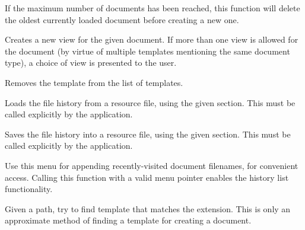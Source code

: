 If the maximum number of documents has been reached, this function
will delete the oldest currently loaded document before creating a new one.



Creates a new view for the given document. If more than one view is allowed for the
document (by virtue of multiple templates mentioning the same document type), a choice
of view is presented to the user.



Removes the template from the list of templates.



Loads the file history from a resource file, using the given section. This must be called
explicitly by the application.



Saves the file history into a resource file, using the given section. This must be called
explicitly by the application.



Use this menu for appending recently-visited document filenames, for convenient
access. Calling this function with a valid menu pointer enables the history
list functionality.



Given a path, try to find template that matches the extension. This is only
an approximate method of finding a template for creating a document.



